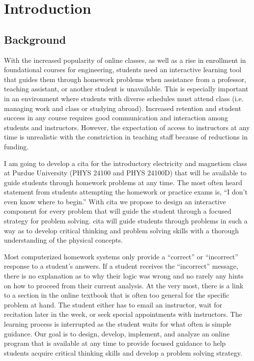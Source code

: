 \chapter[Chapter 1: Introduction]{Introduction}

\section{Background}

With the increased popularity of online classes, as well as a rise in enrollment in foundational courses for engineering, students need an interactive learning tool that guides them through homework problems when assistance from a professor, teaching assistant, or another student is unavailable. This is especially important in an environment where students with diverse schedules must attend class (i.e. managing work and class or studying abroad). Increased retention and student success in any course requires good communication and interaction among students and instructors.  However, the expectation of access to instructors at any time is unrealistic with the constriction in teaching staff because of reductions in funding.

I am going to develop a \gls{cita} for the introductory electricity and magnetism class at Purdue University (PHYS 24100 and PHYS 24100D) that will be available to guide students through homework problems at any time. The most often heard statement from students attempting the homework or practice exams is, “I don’t even know where to begin.” With \gls{cita} we propose to design an interactive component for every problem that will guide the student through a focused strategy for problem solving. \gls{cita} will guide students through problems in such a way as to develop critical thinking and problem solving skills with a thorough understanding of the physical concepts.

Most computerized homework systems only provide a ``correct'' or ``incorrect'' response to a student’s answers. If a student receives the ``incorrect'' message, there is no explanation as to why their logic was wrong and no rarely any hints on how to proceed from their current analysis. At the very most, there is a link to a section in the online textbook that is often too general for the specific problem at hand. The student either has to email an instructor, wait for recitation later in the week, or seek special appointments with instructors. The learning process is interrupted as the student waits for what often is simple guidance. Our goal is to design, develop, implement, and analyze an online program that is available at any time to provide focused guidance to help students acquire critical thinking skills and develop a problem solving strategy.

